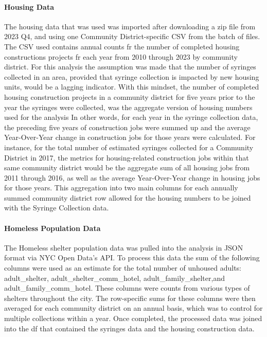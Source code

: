 \documentclass[
]{article}
\begin{document}
\paragraph{Housing Data}\label{housing-data}

The housing data that was used was imported after downloading a zip file
from 2023 Q4, and using one Community District-specific CSV from the
batch of files. The CSV used contains annual counts fr the number of
completed housing constructions projects fr each year from 2010 through
2023 by community district. For this analysis the assumption was made
that the number of syringes collected in an area, provided that syringe
collection is impacted by new housing units, would be a lagging
indicator. With this mindset, the number of completed housing
construction projects in a community district for five years prior to
the year the syringes were collected, was the aggregate version of
housing numbers used for the analysis In other words, for each year in
the syringe collection data, the preceding five years of construction
jobs were summed up and the average Year-Over-Year change in
construction jobs for those years were calculated. For instance, for the
total number of estimated syringes collected for a Community District in
2017, the metrics for housing-related construction jobs within that same
community district would be the aggregate sum of all housing jobs from
2011 through 2016, as well as the average Year-Over-Year change in
housing jobs for those years. This aggregation into two main columns for
each annually summed community district row allowed for the housing
numbers to be joined with the Syringe Collection data.

\paragraph{Homeless Population Data}\label{homeless-population-data}

The Homeless shelter population data was pulled into the analysis in
JSON format via NYC Open Data's API. To process this data the sum of the
following columns were used as an estimate for the total number of
unhoused adults: adult\_shelter, adult\_shelter\_comm\_hotel,
adult\_family\_shelter,and adult\_family\_comm\_hotel. These columns
were counts from various types of shelters throughout the city. The
row-specific sums for these columns were then averaged for each
community district on an annual basis, which was to control for multiple
collections within a year. Once completed, the processed data was joined
into the df that contained the syringes data and the housing
construction data.
\end{document}
